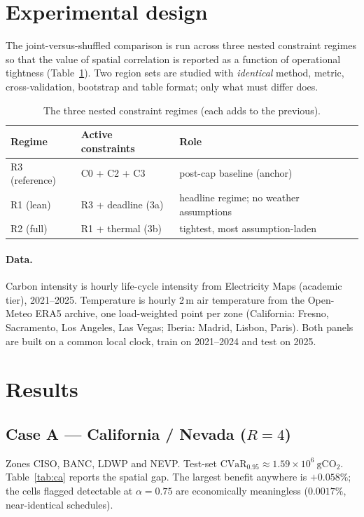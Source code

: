 \documentclass[11pt]{article}
\newcommand{\CVaR}{\mathrm{CVaR}}
\begin{document}
\section{Experimental design}
The joint-versus-shuffled comparison is run across three nested constraint regimes so that the value of
spatial correlation is reported as a function of operational tightness (Table~\ref{tab:regimes}). Two
region sets are studied with \emph{identical} method, metric, cross-validation, bootstrap and table
format; only what must differ does.

\begin{table}[h]\centering
\caption{The three nested constraint regimes (each adds to the previous).}
\label{tab:regimes}
\begin{tabular}{@{}lll@{}}
\toprule
Regime & Active constraints & Role \\
\midrule
R3 (reference) & C0 + C2 + C3 & post-cap baseline (anchor) \\
R1 (lean)      & R3 + deadline (3a) & headline regime; no weather assumptions \\
R2 (full)      & R1 + thermal (3b) & tightest, most assumption-laden \\
\bottomrule
\end{tabular}
\end{table}

\paragraph{Data.} Carbon intensity is hourly life-cycle intensity from Electricity Maps (academic tier),
2021--2025. Temperature is hourly 2\,m air temperature from the Open-Meteo ERA5 archive, one
load-weighted point per zone (California: Fresno, Sacramento, Los Angeles, Las Vegas; Iberia: Madrid,
Lisbon, Paris). Both panels are built on a common local clock, train on 2021--2024 and test on 2025.

\section{Results}

\subsection{Case A --- California / Nevada ($R=4$)}
Zones CISO, BANC, LDWP and NEVP. Test-set $\CVaR_{0.95}\approx 1.59\times 10^{6}\ \mathrm{gCO_2}$.
Table~\ref{tab:ca} reports the spatial gap. The largest benefit anywhere is $+0.058\%$; the cells flagged
detectable at $\alpha=0.75$ are economically meaningless ($0.0017\%$, near-identical schedules).
\end{document}
